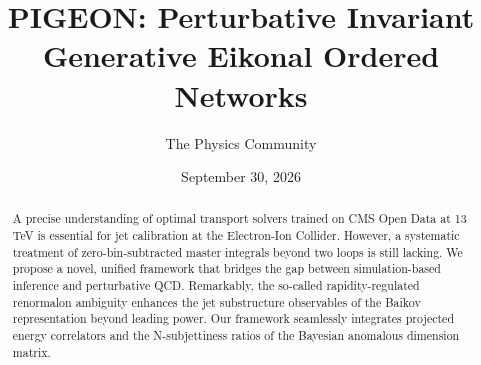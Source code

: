 \documentclass[11pt]{article}
\title{PIGEON: Perturbative Invariant Generative Eikonal Ordered Networks}
\author{The Physics Community}
\date{September 30, 2026}
\numberwithin{equation}{section}
\theoremstyle{definition}
\theoremstyle{remark}
\begin{document}
\maketitle
\begin{abstract}
A precise understanding of optimal transport solvers trained on CMS Open
Data at 13 TeV is essential for jet calibration at the Electron-Ion
Collider. However, a systematic treatment of zero-bin-subtracted master
integrals beyond two loops is still lacking. We propose a novel, unified
framework that bridges the gap between simulation-based inference and
perturbative QCD. Remarkably, the so-called rapidity-regulated
renormalon ambiguity enhances the jet substructure observables of the
Baikov representation beyond leading power. Our framework seamlessly
integrates projected energy correlators and the N-subjettiness ratios of
the Bayesian anomalous dimension matrix.
\end{abstract}
\tableofcontents





\nocite{*}


\end{document}
